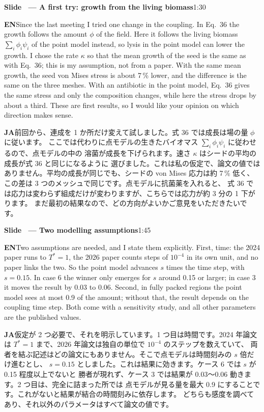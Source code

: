 \documentclass[11pt,a4paper]{article}
\newcounter{sl}
\newcommand{\slide}[2]{\stepcounter{sl}\vspace{8pt}%
  {\color{c3}\large\bfseries Slide \thesl\ --- #1}\hfill{\small #2}\par\vspace{2pt}}
\newcommand{\EN}{\textbf{EN}\quad}
\newcommand{\JA}{\par\textbf{JA}\quad}
\begin{document}
\slide{A first try: growth from the living biomass}{1:30}
\EN Since the last meeting I tried one change in the coupling. In Eq.\ 36 the
growth follows the amount $\phi$ of the field. Here it follows the living
biomass $\sum_i\phi_i\psi_i$ of the point model instead, so lysis in the point
model can lower the growth. I chose the rate $\kappa$ so that the mean growth
of the seed is the same as with Eq.\ 36; this is my assumption, not from a
paper. With the same mean growth, the seed von Mises stress is about 7\,\% lower,
and the difference is the same on the three meshes. With an antibiotic in the
point model, Eq.\ 36 gives the same stress and only the composition changes,
while here the stress drops by about a third. These are first results, so I
would like your opinion on which direction makes sense.
\JA 前回から、連成を 1 か所だけ変えて試しました。式 36 では成長は場の量 $\phi$ に従います。
ここでは代わりに点モデルの生きたバイオマス $\sum_i\phi_i\psi_i$ に従わせるので、点モデルの中の
溶菌が成長を下げられます。速さ $\kappa$ はシードの平均の成長が式 36 と同じになるように
選びました。これは私の仮定で、論文の値ではありません。平均の成長が同じでも、シードの
von Mises 応力は約 7\,\% 低く、この差は 3 つのメッシュで同じです。点モデルに抗菌薬を入れると、
式 36 では応力は変わらず組成だけが変わりますが、こちらでは応力が約 3 分の 1 下がります。
まだ最初の結果なので、どの方向がよいかご意見をいただきたいです。

\slide{Two modelling assumptions}{1:45}
\EN Two assumptions are needed, and I state them explicitly. First, time: the
2024 paper runs to $T^*=1$, the 2026 paper counts steps of $10^{-4}$ in its own
unit, and no paper links the two. So the point model advances $s$ times the
time step, with $s=0.15$. In case 6 the winner only emerges for $s$ around
0.15 or larger; in case 3 it moves the result by 0.03 to 0.06. Second, in
fully packed regions the point model sees at most 0.9 of the amount; without
that, the result depends on the coupling time step. Both come with a
sensitivity study, and all other parameters are the published values.
\JA 仮定が 2 つ必要で、それを明示しています。1 つ目は時間です。2024 年論文は
$T^*=1$ まで、2026 年論文は独自の単位で $10^{-4}$ のステップを数えていて、
両者を結ぶ記述はどの論文にもありません。そこで点モデルは時間刻みの $s$ 倍だけ進むとし、
$s=0.15$ としました。これは結果に効きます。ケース 6 では $s$ が 0.15 程度以上でないと
勝者が現れず、ケース 3 では結果が 0.03〜0.06 動きます。2 つ目は、完全に詰まった所では
点モデルが見る量を最大 0.9 にすることです。これがないと結果が結合の時間刻みに依存します。
どちらも感度を調べてあり、それ以外のパラメータはすべて論文の値です。
\end{document}
